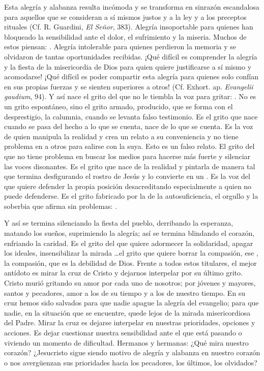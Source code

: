 \begin{body}
Esta alegría y alabanza resulta incómoda y se transforma en sinrazón escandalosa para aquellos que se consideran a sí mismos justos y  a la ley y a los preceptos rituales (Cf. R. Guardini, \textit{El Señor}, 383). Alegría insoportable para quienes han bloqueado la sensibilidad ante el dolor, el sufrimiento y la miseria. Muchos de estos piensan: . Alegría intolerable para quienes perdieron la memoria y se olvidaron de tantas oportunidades recibidas. ¡Qué difícil es comprender la alegría y la fiesta de la misericordia de Dios para quien quiere justificarse a sí mismo y acomodarse! ¡Qué difícil es poder compartir esta alegría para quienes solo confían en sus propias fuerzas y se sienten superiores a otros! (Cf. Exhort. ap. \textit{Evangelii gaudium}, 94). Y así nace el grito del que no le tiembla la voz para gritar: . No es un grito espontáneo, sino el grito armado, producido, que se forma con el desprestigio, la calumnia, cuando se levanta falso testimonio. Es el grito que nace cuando se pasa del hecho a lo que se cuenta, nace de lo que se cuenta. Es la voz de quien manipula la realidad y crea un relato a su conveniencia y no tiene problema en  a otros para salirse con la suya. Esto es un falso relato. El grito del que no tiene problema en buscar los medios para hacerse más fuerte y silenciar las voces disonantes. Es el grito que nace de  la realidad y pintarla de manera tal que termina desfigurando el rostro de Jesús y lo convierte en un . Es la voz del que quiere defender la propia posición desacreditando especialmente a quien no puede defenderse. Es el grito fabricado por la  de la autosuficiencia, el orgullo y la soberbia que afirma sin problemas: .

Y así se termina silenciando la fiesta del pueblo, derribando la esperanza, matando los sueños, suprimiendo la alegría; así se termina blindando el corazón, enfriando la caridad. Es el grito del  que quiere adormecer la solidaridad, apagar los ideales, insensibilizar la mirada \ldots el grito que quiere borrar la compasión, ese , la compasión, que es la debilidad de Dios. Frente a todos estos titulares, el mejor antídoto es mirar la cruz de Cristo y dejarnos interpelar por su último grito. Cristo murió gritando su amor por cada uno de nosotros; por jóvenes y mayores, santos y pecadores, amor a los de su tiempo y a los de nuestro tiempo. En su cruz hemos sido salvados para que nadie apague la alegría del evangelio; para que nadie, en la situación que se encuentre, quede lejos de la mirada misericordiosa del Padre. Mirar la cruz es dejarse interpelar en nuestras prioridades, opciones y acciones. Es dejar cuestionar nuestra sensibilidad ante el que está pasando o viviendo un momento de dificultad. Hermanos y hermanas: ¿Qué mira nuestro corazón? ¿Jesucristo sigue siendo motivo de alegría y alabanza en nuestro corazón o nos avergüenzan sus prioridades hacia los pecadores, los últimos, los olvidados?


\end{body}
